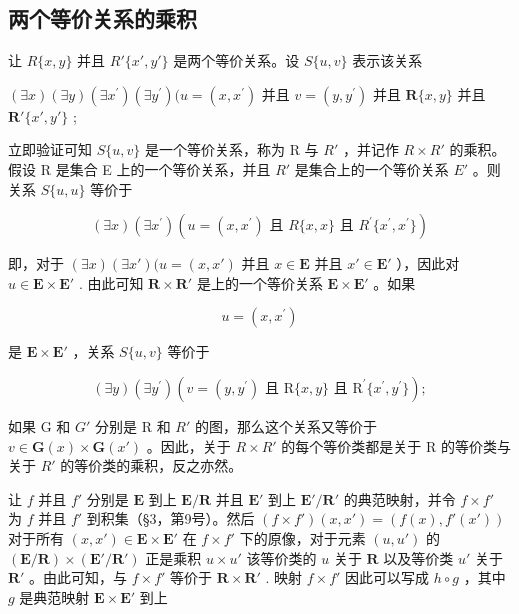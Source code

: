 \subsection{两个等价关系的乘积}

让 \(R\{x, y\}\) 并且 \(R'\{x', y'\}\) 是两个等价关系。设 \(S\{u, v\}\) 表示该关系

\((\exists x)(\exists y)(\exists x^{\prime})(\exists y^{\prime})(u = (x,x^{\prime})\) 并且 \(v = (y,y^{\prime})\) 并且 \(\mathbf{R}\{x,y\}\) 并且 \(\mathbf{R}'\{x',y'\}\) ;

立即验证可知 \(S\{u, v\}\) 是一个等价关系，称为 R 与 \(R'\) ，并记作 \(R \times R'\) 的乘积。假设 R 是集合 E 上的一个等价关系，并且 \(R'\) 是集合上的一个等价关系 \(E'\) 。则关系 \(S\{u, u\}\) 等价于

\[
(\exists x) (\exists x ^ {\prime}) (u = (x, x ^ {\prime}) \text { 且 } R \{x, x \} \text { 且 } R ^ {\prime} \{x ^ {\prime}, x ^ {\prime} \})
\]

即，对于 \((\exists x)(\exists x')(u = (x, x')\) 并且 \(x \in \mathbf{E}\) 并且 \(x' \in \mathbf{E}'\) ），因此对 \(u \in \mathbf{E} \times \mathbf{E}'\) . 由此可知 \(\mathbf{R} \times \mathbf{R}'\) 是上的一个等价关系 \(\mathbf{E} \times \mathbf{E}'\) 。如果

\[
u = (x, x ^ {\prime})
\]

是 \(\mathbf{E} \times \mathbf{E}'\) ，关系 \(S\{u, v\}\) 等价于

\[
(\exists y) (\exists y ^ {\prime}) (v = (y, y ^ {\prime}) \text {   且   } \mathrm{R} \{x, y \} \text {   且   } \mathrm{R} ^ {\prime} \{x ^ {\prime}, y ^ {\prime} \});
\]

如果 G 和 \(G'\) 分别是 R 和 \(R'\) 的图，那么这个关系又等价于 \(v \in \mathbf{G}(x) \times \mathbf{G}(x')\) 。因此，关于 \(R \times R'\) 的每个等价类都是关于 R 的等价类与关于 \(R'\) 的等价类的乘积，反之亦然。

让 \(f\) 并且 \(f'\) 分别是 \(\mathbf{E}\) 到上 \(\mathbf{E}/\mathbf{R}\) 并且 \(\mathbf{E}'\) 到上 \(\mathbf{E}'/\mathbf{R}'\) 的典范映射，并令 \(f \times f'\) 为 \(f\) 并且 \(f'\) 到积集（§3，第9号）。然后 \((f \times f')(x, x') = (f(x), f'(x'))\) 对于所有 \((x, x') \in \mathbf{E} \times \mathbf{E}'\) 在 \(f \times f'\) 下的原像，对于元素 \((u, u')\) 的 \((\mathbf{E}/\mathbf{R}) \times (\mathbf{E}'/\mathbf{R}')\) 正是乘积 \(u \times u'\) 该等价类的 \(u\) 关于 \(\mathbf{R}\) 以及等价类 \(u'\) 关于 \(\mathbf{R}'\) 。由此可知，与 \(f \times f'\) 等价于 \(\mathbf{R} \times \mathbf{R}'\) . 映射 \(f \times f'\) 因此可以写成 \(h \circ g\) ，其中 \(g\) 是典范映射 \(\mathbf{E} \times \mathbf{E}'\) 到上

